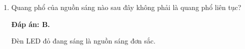 \begin{enumerate}[label=\bfseries Câu \arabic*:]
{		Vị trí vạch tối trong quang phổ hấp thụ của một nguyên tố trùng với vị trí vạch sáng màu trong quang phổ phát xạ của nguyên tố đó. 
	}
		\item {} 
	\cauhoi
	{Quang phổ của nguồn sáng nào sau đây không phải là quang phổ liên tục?
		
	}
	
	\loigiai
	{		\textbf{Đáp án: B.}
		
		Đèn LED đỏ đang sáng là nguồn sáng đơn sắc. 
	}
\end{enumerate}

